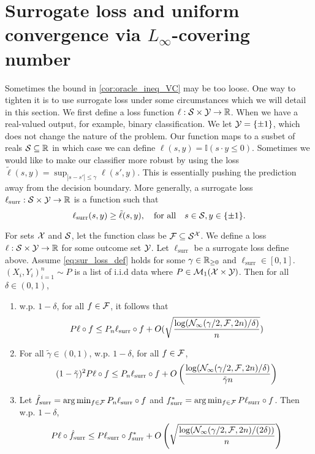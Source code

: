 \documentclass[twoside]{article}
\newcommand{\I}{\mathbb{I}}
\newcommand{\surr}{\mathrm{surr}}
\begin{document}
\section{Surrogate loss and uniform convergence via $L_\infty$-covering number}
Sometimes the bound in \cref{cor:oracle_ineq_VC} may be too loose. One way to tighten it is to use surrogate loss under some circumstances which we will detail in this section. We first define a loss function $\ell:\mathcal{S}\times\mathcal{Y} \to\mathbb{R}$. When we have a real-valued output, for example, binary classification.
We let $\mathcal{Y}=\{\pm 1\}$, which does not change the nature of the problem. Our function maps to a susbet of reals $\mathcal{S}\subseteq \mathbb{R}$ in which case we can define $\ell(s,y)=\I(s\cdot y\le 0)$. Sometimes we would like to make our classifier more robust by using the loss $\tilde \ell(s,y)=\sup_{|s-s'|\le \gamma}\ell(s',y)$. This is essentially pushing the prediction away from the decision boundary. More generally, a surrogate loss $\ell_{\surr}:\cS\times \cY\to\R$ is a function such that 
\begin{equation}\label{eq:sur_loss_def}
    \ell_\surr(s,y)\ge \tilde \ell(s,y), \text{\quad for all\quad} s\in \cS, y\in \{\pm 1\}.
\end{equation}
\begin{theorem}\label{thm:oracle_surr_loss}
    For sets $\mathcal{X}$ and $\mathcal{S}$, let the function class be $\mathcal{F}\subseteq \mathcal{S}^{\mathcal{X}}$. 
    We define a loss $\ell:\mathcal{S}\times\mathcal{Y} \to\mathbb{R}$ for some outcome set $\mathcal{Y}$. Let $\ell_\surr$ be a surrogate loss define above. Assume \cref{eq:sur_loss_def} holds for some $\gamma\in \mathbb{R}_{\ge 0}$ and $\ell_{\surr}\in [0,1]$. $(X_i,Y_i)_{i=1}^n \sim P$ is a list of i.i.d data  where $P\in \mathcal{M}_1(\mathcal{X}\times \mathcal{Y})$.
    Then for all $\delta\in (0,1)$, 
    \begin{enumerate}
        \item w.p. $1-\delta$, for all $f\in \mathcal{F}$, it follows that \[P \ell\circ f\le P_n \ell_{\surr}\circ f + O(\sqrt{\frac{\log(\cN_\infty(\gamma/2,\cF,2n)/\delta)}{n}})\]
        \item For all $\tilde\gamma\in (0,1)$, w.p. $1-\delta$, for all $f\in \mathcal{F}$, \[(1-\tilde \gamma)^2 P\ell\circ f\le P_n \ell_\surr \circ f+O \left(\frac{\log(\cN_\infty(\gamma/2, \cF, 2n)/\delta)}{\tilde \gamma n}\right)\]
        \item Let $\hat f_\surr = \arg\min_{f\in \cF} P_n \ell_\surr \circ f$ and $f^*_\surr = \arg\min_{f\in \cF} P\ell_\surr\circ f$. Then w.p. $1-\delta$, \[P\ell\circ \hat f_\surr \le P\ell_\surr \circ f^*_\surr + O\left(\sqrt{\frac{\log(\cN_\infty (\gamma/2, \cF, 2n)/(2\delta))}{n}}\right)\]
    \end{enumerate}
\end{theorem}
\end{document}
